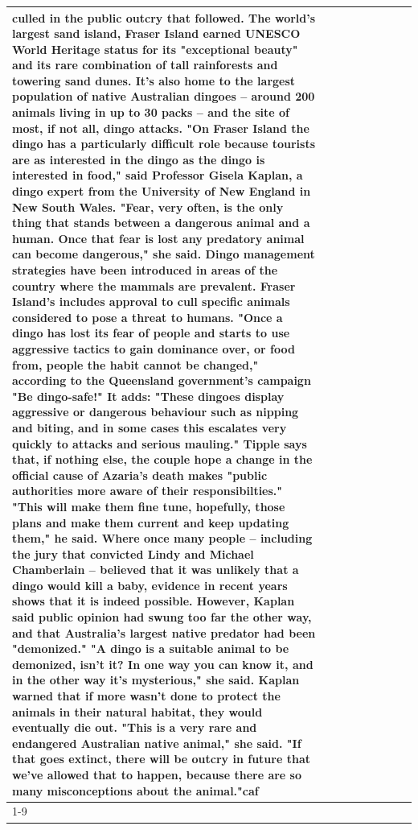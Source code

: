 \begin{table}[H]
\begin{tabular}{lllrlllll}
culled in the public outcry that followed. The world's largest sand island, Fraser Island earned UNESCO World Heritage status for its "exceptional beauty" and its rare combination of tall rainforests and towering sand dunes. It's also home to the largest population of native Australian dingoes -- around 200 animals living in up to 30 packs -- and the site of most, if not all, dingo attacks. "On Fraser Island the dingo has a particularly difficult role because tourists are as interested in the dingo as the dingo is interested in food," said Professor Gisela Kaplan, a dingo expert from the University of New England in New South Wales. "Fear, very often, is the only thing that stands between a dangerous animal and a human. Once that fear is lost any predatory animal can become dangerous," she said. Dingo management strategies have been introduced in areas of the country where the mammals are prevalent. Fraser Island's includes approval to cull specific animals considered to pose a threat to humans. "Once a dingo has lost its fear of people and starts to use aggressive tactics to gain dominance over, or food from, people the habit cannot be changed," according to the Queensland government's campaign "Be dingo-safe!" It adds: "These dingoes display aggressive or dangerous behaviour such as nipping and biting, and in some cases this escalates very quickly to attacks and serious mauling." Tipple says that, if nothing else, the couple hope a change in the official cause of Azaria's death makes "public authorities more aware of their responsibilties." "This will make them fine tune, hopefully, those plans and make them current and keep updating them," he said. Where once many people -- including the jury that convicted Lindy and Michael Chamberlain -- believed that it was unlikely that a dingo would kill a baby, evidence in recent years shows that it is indeed possible. However, Kaplan said public opinion had swung too far the other way, and that Australia's largest native predator had been "demonized." "A dingo is a suitable animal to be demonized, isn't it? In one way you can know it, and in the other way it's mysterious," she said. Kaplan warned that if more wasn't done to protect the animals in their natural habitat, they would eventually die out. "This is a very rare and endangered Australian native animal," she said. "If that goes extinct, there will be outcry in future that we've allowed that to happen, because there are so many misconceptions about the animal."caf \\
\cline{1-9}

\end{tabular}
\end{table}
